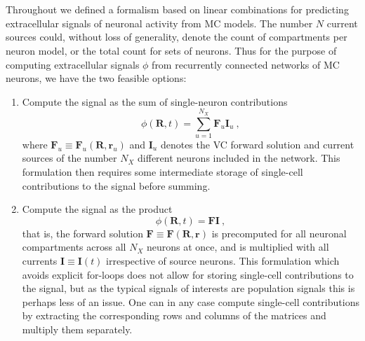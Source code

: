 \section{}
\label{sec:Schemes:networkLFPy}


Throughout  we defined a formalism based on linear combinations for predicting extracellular signals of neuronal activity from MC models. 
The number $N$ current sources could, without loss of generality, denote the count of compartments per neuron model, 
or the total count for sets of neurons. 
Thus for the purpose of computing extracellular signals 
$\phi$  
from recurrently connected networks of MC neurons, 
we have the two feasible options:
\begin{enumerate}
\item Compute the signal as the sum of single-neuron contributions
	\begin{equation}
	\phi(\mathbf{R}, t) = \sum_{u =1}^{N_X} \mathbf{F}_u\mathbf{I}_u~,
	\end{equation}
	where $ \mathbf{F}_u \equiv \mathbf{F}_u(\mathbf{R},\mathbf{r}_u)$  and $ \mathbf{I}_u$ denotes the VC forward solution and current sources of the number $N_X$ different neurons included in the network. 
	This formulation then requires some intermediate storage of single-cell contributions to the signal before summing.
\item Compute the signal as the product
	\begin{equation}
	\phi(\mathbf{R}, t) = \mathbf{F}\mathbf{I}~, 
	\end{equation}
	that is, the forward solution $\mathbf{F} \equiv \mathbf{F}(\mathbf{R},\mathbf{r})$ is precomputed for all neuronal compartments across all $N_X$ neurons at once, and is multiplied with all currents $\mathbf{I} \equiv \mathbf{I}(t)$ irrespective of source neurons. 
	This formulation which avoids explicit for-loops does not allow for storing single-cell contributions to the signal, 
	but as the typical signals of interests are population signals this is perhaps less of an issue. 
	One can in any case compute single-cell contributions by extracting the corresponding rows and columns of the matrices and multiply them separately.
\end{enumerate}


